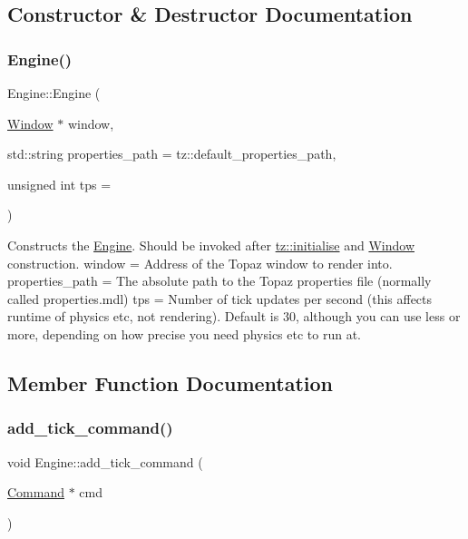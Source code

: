 \subsection{Constructor \& Destructor Documentation}
\mbox{\label{class_engine_a1e76f3786243e116f071e98724fe4a25}} 
\subsubsection{\texorpdfstring{Engine()}{Engine()}}
{\footnotesize\ttfamily Engine\+::\+Engine (\begin{DoxyParamCaption}\item[{\mbox{\hyperlink{class_window}{Window}} $\ast$}]{window,  }\item[{std\+::string}]{properties\+\_\+path = {\ttfamily tz\+:\+:default\+\_\+properties\+\_\+path},  }\item[{unsigned int}]{tps = {} }\end{DoxyParamCaption})}

Constructs the \mbox{\hyperlink{class_engine}{Engine}}. Should be invoked after \mbox{\hyperlink{namespacetz_aeb2530fee0e452e5ba5f4d0d0ebaa797}{tz\+::initialise}} and \mbox{\hyperlink{class_window}{Window}} construction. window = Address of the Topaz window to render into. properties\+\_\+path = The absolute path to the Topaz properties file (normally called properties.\+mdl) tps = Number of tick updates per second (this affects runtime of physics etc, not rendering). Default is 30, although you can use less or more, depending on how precise you need physics etc to run at. 

\subsection{Member Function Documentation}
\mbox{\label{class_engine_ab2355e889851bc53a6a9e151ca2a1e98}} 
\subsubsection{\texorpdfstring{add\+\_\+tick\+\_\+command()}{add\_tick\_command()}}
{\footnotesize\ttfamily void Engine\+::add\+\_\+tick\+\_\+command (\begin{DoxyParamCaption}\item[{\mbox{\hyperlink{class_command}{Command}} $\ast$}]{cmd }\end{DoxyParamCaption})}


